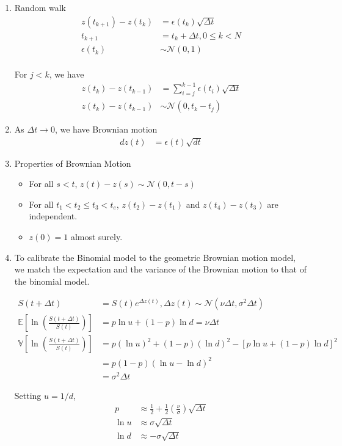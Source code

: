 \documentclass[12pt,twoside]{article}
\begin{document}
\begin{enumerate}
	\item Random walk
		\begin{align*}
			z(t_{k+1}) - z(t_{k}) &= \epsilon (t_k) \sqrt{\Delta t}\\
			t_{k+1} &= t_k +\Delta t, 0 \leq k <N \\
			\epsilon (t_k) &\sim \mathcal{N}(0,1)\\
		\end{align*}
		
		For $j<k$, we have
		\begin{align*}
			z(t_k) - z(t_{k-1}) &= \sum_{i=j}^{k-1} \epsilon (t_i)\sqrt{\Delta t}\\
			z(t_k) - z(t_{k-1}) &\sim \mathcal{N} \left(0, t_k-t_j\right)
		\end{align*}
		
	\item As $\Delta t \rightarrow 0$, we have Brownian motion
		\begin{align*}
			dz(t) & = \epsilon (t) \sqrt{dt}
		\end{align*}
		
	\item Properties of Brownian Motion
		\begin{itemize}
			\item For all $s<t$, $z(t) - z(s) \sim \mathcal{N}(0, t-s)$
			\item For all $t_1<t_2 \leq t_3 <t_e$, $z(t_2)-z(t_1)$ and $z(t_4)-z(t_3)$ are independent.
			\item $z(0) =1$ almost surely.
		\end{itemize}			

	\item To calibrate the Binomial model to the geometric Brownian motion model, we match the expectation and the variance of the Brownian motion to that of the binomial model.
		
		\begin{align*}
			S(t+\Delta t) &= S(t)e^{\Delta z(t)} , \Delta z(t) \sim \mathcal{N} (\nu\Delta t, \sigma^2\Delta t) \\
			\mathbb{E}\left[ \ln \left(\frac{S(t+\Delta t)}{S(t)}\right)\right] & = p \ln u + (1-p) \ln d = \nu \Delta t\\
			\mathbb{V}\left[\ln \left(\frac{S(t+\Delta t)}{S(t)}\right)\right] & = p (\ln u)^2 +  (1-p)(\ln d)^2 -  [p \ln u + (1-p) \ln d ]^2\\
			& = p(1-p)(\ln u - \ln d)^2\\
			& = \sigma^2 \Delta t
		\end{align*}

		Setting $u = 1/d$, 
		\begin{align*}
			p		& \approx \frac{1}{2} + \frac{1}{2} \left(\frac{\nu}{\sigma}\right)\sqrt{\Delta t}\\
			\ln u	&  \approx \sigma\sqrt{\Delta t}\\
			\ln d & 	\approx -\sigma\sqrt{\Delta t}
		\end{align*}

\end{enumerate}
\end{document}
